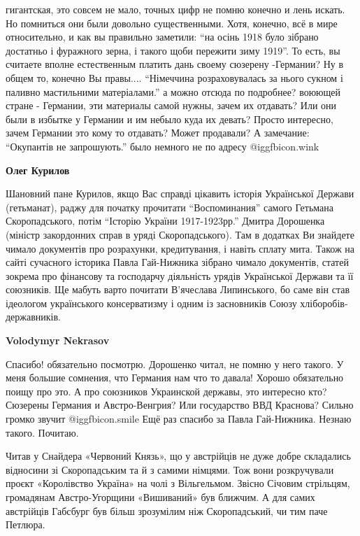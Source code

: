 \begin{itemize}
\begin{itemize}
\begin{itemize}
гигантская, это совсем не мало, точных цифр не помню конечно и лень искать. Но
помниться они были довольно существенными. Хотя, конечно, всё в мире
относительно, и как вы правильно заметили: \enquote{на осінь 1918 було зібрано
достатньо і фуражного зерна, і такого щоби пережити зиму 1919}. То есть, вы
считаете вполне естественным платить дань своему сюзерену -Германии? Ну в общем
то, конечно Вы правы.... \enquote{Німеччина розраховувалась за нього сукном і паливно
мастильними матеріалами.} а можно отсюда по подробнее? воюющей стране -
Германии, эти материалы самой нужны, зачем их отдавать? Или они были в избытке
у Германии и им небыло куда их девать? Просто интересно, зачем Германии это
кому то отдавать? Может продавали? А замечание: \enquote{Окупантів не запрошують.} было
немного не по адресу  @igg{fbicon.wink} 

\textbf{Олег Курилов} 

Шановний пане Курилов, якщо Вас справді цікавить історія Української Держави
(гетьманат), раджу для початку прочитати \enquote{Воспоминания} самого Гетьмана
Скоропадського, потім \enquote{Історію України 1917-1923рр.} Дмитра Дорошенка (міністр
закордонних справ в уряді Скоропадського). Там в додатках Ви знайдете чимало
документів про розрахунки, кредитування, і навіть сплату мита. Також на сайті
сучасного історика Павла Гай-Нижника зібрано чимало документів, статей зокрема
про фінансову та господарчу діяльність урядів Української Держави та її
союзників. Ще мабуть варто почитати В'ячеслава Липинського, бо саме він став
ідеологом українського консерватизму і одним із засновників Союзу
хліборобів-державників.

\textbf{Volodymyr Nekrasov} 

Спасибо! обязательно посмотрю. Дорошенко читал, не помню у него такого. У меня
большие сомнения, что Германия нам что то давала! Хорошо обязательно поищу про
это. А про союзников Украинской державы, это интересно кто? Сюзерены Германия и
Австро-Венгрия? Или государство ВВД Краснова? Сильно громко звучит  @igg{fbicon.smile}  Ещё раз
спасибо за Павла Гай-Нижника. Незнаю такого. Почитаю.

\end{itemize} %

\end{itemize} %


Читав у Снайдера «Червоний Князь», що у австрійців не дуже добре складались
відносини зі Скоропадським та й з самими німцями. Тож вони розкручували проєкт
«Королівство Україна» на чолі з Вільгельмом. Звісно Січовим стрільцям,
громадянам Австро-Угорщини «Вишиваний» був ближчим. А для самих австрійців
Габсбург був більш зрозумілим ніж Скоропадський, чи тим паче Петлюра.


\end{itemize}
